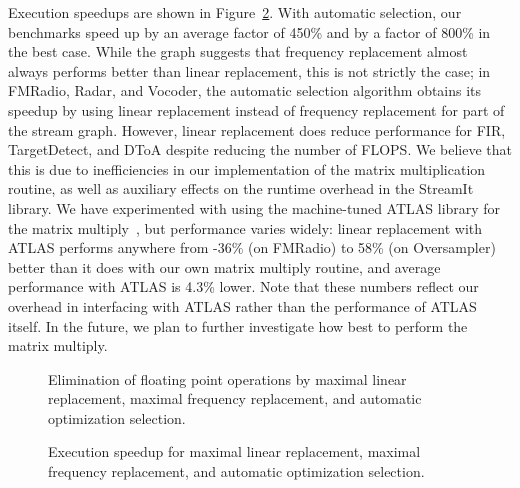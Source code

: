 Execution speedups are shown in Figure~\ref{fig:execution-speedup}.
With automatic selection, our benchmarks speed up by an average factor
of 450\% and by a factor of 800\% in the best case.  While the graph
suggests that frequency replacement almost always performs better than
linear replacement, this is not strictly the case; in FMRadio, Radar,
and Vocoder, the automatic selection algorithm obtains its speedup by
using linear replacement instead of frequency replacement for part of
the stream graph.  However, linear replacement does reduce performance
for FIR, TargetDetect, and DToA despite reducing the number of FLOPS.
We believe that this is due to inefficiencies in our implementation of
the matrix multiplication routine, as well as auxiliary effects on the
runtime overhead in the StreamIt library.  We have experimented with
using the machine-tuned ATLAS library for the matrix
multiply~\cite{whaley01automated}, but performance varies widely:
linear replacement with ATLAS performs anywhere from -36\% (on
FMRadio) to 58\% (on Oversampler) better than it does with our own
matrix multiply routine, and average performance with ATLAS is 4.3\%
lower.  Note that these numbers reflect our overhead in interfacing
with ATLAS rather than the performance of ATLAS itself.  In the
future, we plan to further investigate how best to perform the matrix
multiply.

\begin{figure}[t]
\vspace{-16pt}
\vspace{-16pt}
\caption{Elimination of floating point operations by maximal linear replacement, maximal frequency replacement, and automatic optimization selection.}
\label{fig:flops}
\vspace{-12pt}
\makeline
\vspace{-12pt}
\end{figure}

\begin{figure}[t]
\vspace{-16pt}
\caption{Execution speedup for maximal linear replacement, maximal frequency replacement, and automatic optimization selection.}
\label{fig:execution-speedup}
\vspace{-12pt}
\makeline
\vspace{-12pt}
\end{figure}


